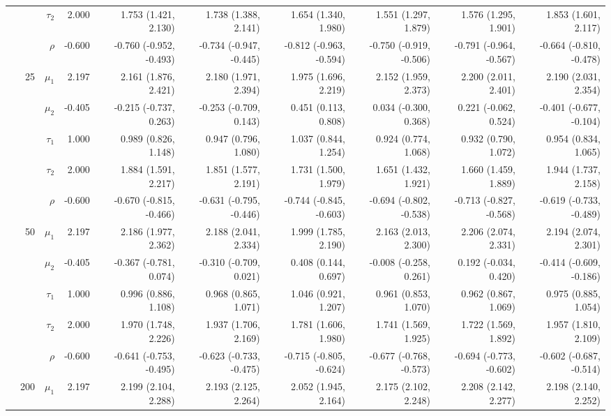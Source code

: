 \documentclass[
]{article}
\begin{document}
\begin{table}
\begin{tabular}[t]{rrrrrrrrrr}
 &  & $\tau_2$ & 2.000 & 1.753 (1.421, 2.130) & 1.738 (1.388, 2.141) & 1.654 (1.340, 1.980) & 1.551 (1.297, 1.879) & 1.576 (1.295, 1.901) & 1.853 (1.601, 2.117)\\
 &  & $\rho$ & -0.600 & -0.760 (-0.952, -0.493) & -0.734 (-0.947, -0.445) & -0.812 (-0.963, -0.594) & -0.750 (-0.919, -0.506) & -0.791 (-0.964, -0.567) & -0.664 (-0.810, -0.478)\\
\addlinespace
 & 25 & $\mu_1$ & 2.197 & 2.161 (1.876, 2.421) & 2.180 (1.971, 2.394) & 1.975 (1.696, 2.219) & 2.152 (1.959, 2.373) & 2.200 (2.011, 2.401) & 2.190 (2.031, 2.354)\\
 &  & $\mu_2$ & -0.405 & -0.215 (-0.737, 0.263) & -0.253 (-0.709, 0.143) & 0.451 (0.113, 0.808) & 0.034 (-0.300, 0.368) & 0.221 (-0.062, 0.524) & -0.401 (-0.677, -0.104)\\
 &  & $\tau_1$ & 1.000 & 0.989 (0.826, 1.148) & 0.947 (0.796, 1.080) & 1.037 (0.844, 1.254) & 0.924 (0.774, 1.068) & 0.932 (0.790, 1.072) & 0.954 (0.834, 1.065)\\
 &  & $\tau_2$ & 2.000 & 1.884 (1.591, 2.217) & 1.851 (1.577, 2.191) & 1.731 (1.500, 1.979) & 1.651 (1.432, 1.921) & 1.660 (1.459, 1.889) & 1.944 (1.737, 2.158)\\
 &  & $\rho$ & -0.600 & -0.670 (-0.815, -0.466) & -0.631 (-0.795, -0.446) & -0.744 (-0.845, -0.603) & -0.694 (-0.802, -0.538) & -0.713 (-0.827, -0.568) & -0.619 (-0.733, -0.489)\\
\addlinespace
 & 50 & $\mu_1$ & 2.197 & 2.186 (1.977, 2.362) & 2.188 (2.041, 2.334) & 1.999 (1.785, 2.190) & 2.163 (2.013, 2.300) & 2.206 (2.074, 2.331) & 2.194 (2.074, 2.301)\\
 &  & $\mu_2$ & -0.405 & -0.367 (-0.781, 0.074) & -0.310 (-0.709, 0.021) & 0.408 (0.144, 0.697) & -0.008 (-0.258, 0.261) & 0.192 (-0.034, 0.420) & -0.414 (-0.609, -0.186)\\
 &  & $\tau_1$ & 1.000 & 0.996 (0.886, 1.108) & 0.968 (0.865, 1.071) & 1.046 (0.921, 1.207) & 0.961 (0.853, 1.070) & 0.962 (0.867, 1.069) & 0.975 (0.885, 1.054)\\
 &  & $\tau_2$ & 2.000 & 1.970 (1.748, 2.226) & 1.937 (1.706, 2.169) & 1.781 (1.606, 1.980) & 1.741 (1.569, 1.925) & 1.722 (1.569, 1.892) & 1.957 (1.810, 2.109)\\
 &  & $\rho$ & -0.600 & -0.641 (-0.753, -0.495) & -0.623 (-0.733, -0.475) & -0.715 (-0.805, -0.624) & -0.677 (-0.768, -0.573) & -0.694 (-0.773, -0.602) & -0.602 (-0.687, -0.514)\\
\addlinespace
 & 200 & $\mu_1$ & 2.197 & 2.199 (2.104, 2.288) & 2.193 (2.125, 2.264) & 2.052 (1.945, 2.164) & 2.175 (2.102, 2.248) & 2.208 (2.142, 2.277) & 2.198 (2.140, 2.252)\\

\end{tabular}
\end{table}
\end{document}
